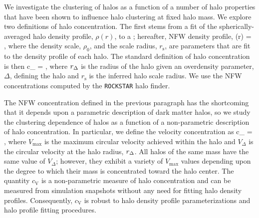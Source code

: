 \documentclass[usenatbib]{mnras}
\begin{document}
We investigate the clustering of halos as a function of a number of halo properties 
that have been shown to influence halo clustering at fixed halo mass. We explore 
two definitions of halo concentration. The first stems from a fit of the spherically-averaged 
halo density profile, $\rho(r)$, to a \citet{navarro_etal97}; hereafter, NFW density profile, 
%
\beq
\rho(r) = ,
\eeq
%
where the density scale, $\rho_0$, and the scale radius, $r_{\mathrm{s}}$, are parameters 
that are fit to the density profile of each halo. The standard definition of halo concentration is then 
\beq
c_{} = ,
\eeq
where $r_{\Delta}$ is the radius of the halo given an overdensity parameter, $\Delta$, defining the halo 
and $r_{\mathrm{s}}$ is the inferred halo scale radius. We use the NFW concentrations computed by the 
{\tt ROCKSTAR} halo finder.  

The NFW concentration defined in the previous paragraph has the shortcoming that it 
depends upon a parametric description of dark matter halos, so we study the clustering dependence 
of halos as a function of a non-parametric description of halo concentration. In particular, we 
define the velocity concentration as 
\beq
c_{} = , 
\eeq
where $V_{\mathrm{max}}$ is the maximum circular velocity achieved within the halo and $V_{\Delta}$ is 
the circular velocity at the halo radius, $r_{\Delta}$. All halos of the same mass have the same value of $V_{\Delta}$; however, 
they exhibit a variety of $V_{\mathrm{max}}$ values depending upon the degree to which their mass is concentrated toward 
the halo center. The quantity $c_{\mathrm{V}}$ is a non-parametric measure of halo concentration and can be measured from 
simulation snapshots without any need for fitting halo density profiles. Consequently, $c_{\mathrm{V}}$ is robust to halo density 
profile parameterizations and halo profile fitting procedures. 
\end{document}
